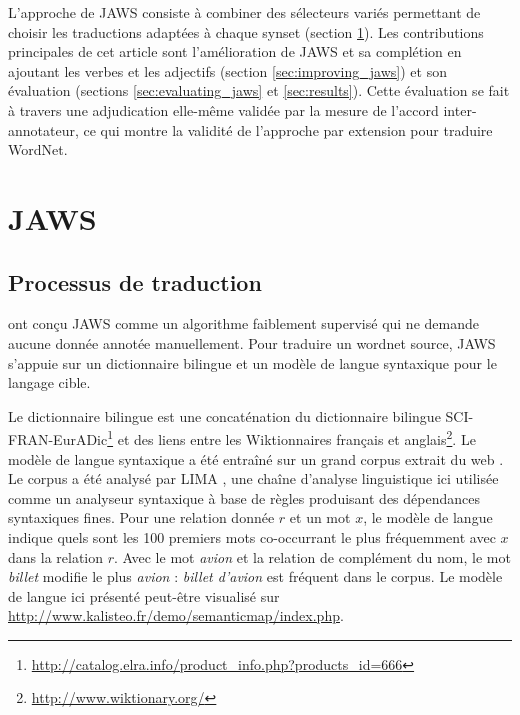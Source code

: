 L'approche de JAWS consiste à combiner des sélecteurs variés permettant de choisir les traductions adaptées à chaque synset (section \ref{sec:jaws}). Les contributions principales de cet article sont l'amélioration de JAWS et sa complétion en ajoutant les verbes et les adjectifs (section \ref{sec:improving_jaws}) et son évaluation (sections \ref{sec:evaluating_jaws} et \ref{sec:results}). Cette évaluation se fait à travers une adjudication elle-même validée par la mesure de l'accord inter-annotateur, ce qui montre la validité de l'approche par extension pour traduire WordNet.

\section{JAWS}
\label{sec:jaws}

\subsection{Processus de traduction}
\label{subsec:translation_process}

\cite{MoutonChalendar2010} ont conçu JAWS comme un algorithme faiblement supervisé qui ne demande aucune donnée annotée manuellement. Pour traduire un wordnet source, JAWS s'appuie sur un dictionnaire bilingue et un modèle de langue syntaxique pour le langage cible.

Le dictionnaire bilingue est une concaténation du dictionnaire bilingue SCI-FRAN-EurADic\footnote{\url{http://catalog.elra.info/product_info.php?products_id=666}} et des liens entre les Wiktionnaires français et anglais\footnote{\url{http://www.wiktionary.org/}}. Le modèle de langue syntaxique a été entraîné sur un grand corpus extrait du web \citep{grefenstette2007conquering}. Le corpus a été analysé par LIMA \citep{LIMA}, une chaîne d'analyse linguistique ici utilisée comme un analyseur syntaxique à base de règles produisant des dépendances syntaxiques fines. Pour une relation donnée $r$ et un mot $x$, le modèle de langue indique quels sont les 100 premiers mots co-occurrant le plus fréquemment avec $x$ dans la relation $r$. Avec le mot \textit{avion} et la relation de complément du nom, le mot \textit{billet} modifie le plus \textit{avion} : \textit{billet d'avion} est fréquent dans le corpus. Le modèle de langue ici présenté peut-être visualisé sur \url{http://www.kalisteo.fr/demo/semanticmap/index.php}.

